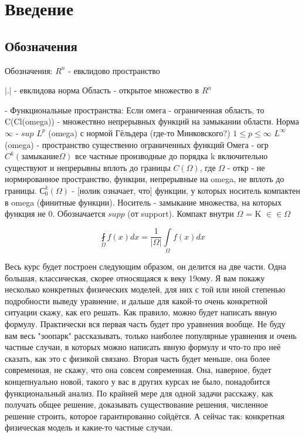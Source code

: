 \chapter*{Введение}
\section*{Обозначения}
Обозначения: $R^n$ - евклидово пространство

$|.|$ - евклидова норма
Область - открытое множество в $R^n$

- Функциональные пространства:
Если омега - ограниченная область, то C(Cl(omega)) - множествно непрерывных функций на замыкании области. Норма $\infty$ - $sup$
$L^p$ (omega) с нормой Гёльдера (где-то Минковского?) $1 \leq p \leq \infty$
$L^\infty$ (omega) - пространство существенно ограниченных функций
Омега - огр
$C^k(замыкание \Omega)$ все частные производные до порядка k включительно существуют и непрерывны вплоть до границы
$C(\Omega)$, где $\Omega$ - откр - не нормированное пространство, функции, непрерывные на omega, не вплоть до границы.
$С^k_0(\Omega)$ - [нолик означает, что] функции, у которых носитель компактен в omega (финитные функции). Носитель - замыкание множества, на которых функция не 0. Обозначается $supp$ (от support).
Компакт внутри $\Omega$ = K $\in\in \Omega$


$$\displaystyle \fint \limits_{\Omega} f(x) dx = \frac{1}{|\Omega|} \int \limits_{\Omega} f(x) dx$$



Весь курс будет построен следующим образом, он делится на две части. Одна большая, классическая, скорее относящаяся к веку 19ому. Я вам покажу несколько конкретных физических моделей, для них с той или иной степенью подробности выведу уравнение, и дальше для какой-то очень конкретной ситуации скажу, как его решать. Как правило, можно будет написать явную формулу. Практически вся первая часть будет про уравнения вообще. Не буду вам весь "зоопарк" рассказывать, только наиболее популярные уравнения и очень частные случаи, в которых можно написать явную формулу и что-то про неё сказать, как это с физикой связано.
Вторая часть будет меньше, она более современная, не скажу, что она совсем современная. Она, наверное, будет концепнуально новой, такого у вас в других курсах не было, понадобится функциональный анализ. По крайней мере для одной задачи расскажу, как получать общее решение, доказывать существование решения, численное решение строить, которое гарантированно сойдётся.
А сейчас так: конкретная физическая модель и какие-то частные случаи.

